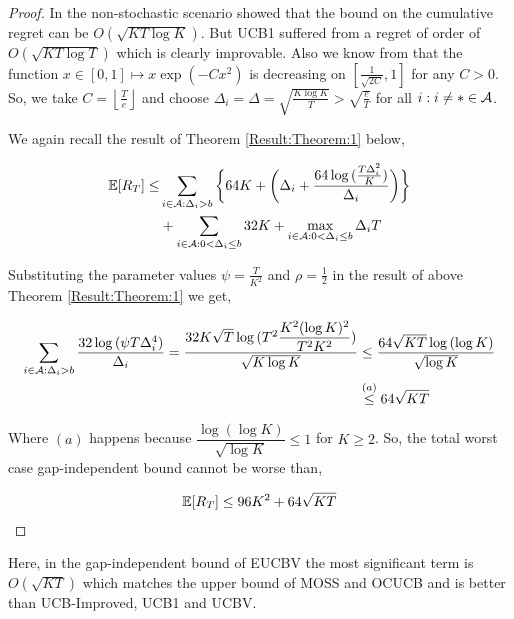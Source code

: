\begin{proof}
\label{Proof:Corollary:1}
In the non-stochastic scenario \cite{auer2002nonstochastic} showed that the bound on the cumulative regret can be $O\left(\sqrt{KT\log K}\right)$. But UCB1 suffered from a regret of order of  $O\left(\sqrt{KT\log T}\right)$  which is clearly improvable. Also we know from \citet{bubeck2011pure} that the function $x\in [0,1]\mapsto x\exp(-Cx^2)$ is  decreasing on $\left[\frac{1}{\sqrt{2C}},1\right ]$ for any $C>0$. So, we take $C=\left\lfloor \frac{T}{e}\right\rfloor$ and choose  $\Delta_{i}=\Delta=\sqrt{\frac{K\log K}{T}}>\sqrt{\frac{e}{T}}$ for all ${i:i\neq *}\in \mathcal{A} $.

	We again recall the result of Theorem \ref{Result:Theorem:1} below, 
	
\begin{align*}
\mathbb{E} [R_{T}] \leq &\sum\limits_{i\in \mathcal{A} :\Delta_{i} > b}\bigg\lbrace 64 K + \bigg(\Delta_{i}+\dfrac{64\log{(\frac{T\Delta_{i}^{2}}{K})}}{\Delta_{i}}\bigg)\bigg \rbrace\\ 
  & +\sum\limits_{i\in \mathcal{A} :0 < \Delta_{i}\leq b} 32 K + \max_{i\in \mathcal{A} :0 < \Delta_{i}\leq b}\Delta_{i}T  
\end{align*}


Substituting the parameter values $\psi=\frac{T}{K^2}$ and $\rho=\frac{1}{2}$ in the result of above Theorem \ref{Result:Theorem:1} we get,
	
	\begin{align*}
	\sum_{i\in \mathcal{A} :\Delta_{i} > b}\dfrac{32\log{(\psi T\Delta_{i}^{4})}}{\Delta_{i}} = \dfrac{32K\sqrt{T}\log{(T^{2}\dfrac{K^{2}(\log K)^{2}}{T^{2} K^2})}}{\sqrt{K\log K}} &\leq  \dfrac{64\sqrt{KT}\log{(\log K)}}{\sqrt{\log K}}\\
	&\overset{(a)}{\leq} 64\sqrt{KT} 
	\end{align*}		
	
 	
	Where $(a)$ happens because $\dfrac{\log{(\log K)}}{\sqrt{\log K}}\leq 1$ for $K\geq 2$. So, the total worst case gap-independent bound cannot be worse than,
	
	\begin{align*}
	\mathbb{E}[R_{T}]\leq 96 K^2 + 64\sqrt{KT}
	\end{align*}		
\end{proof}


Here, in the gap-independent bound of EUCBV the most significant term is $O\left(\sqrt{KT}\right)$ which  matches the upper bound of MOSS and OCUCB and is better than UCB-Improved, UCB1 and UCBV.
